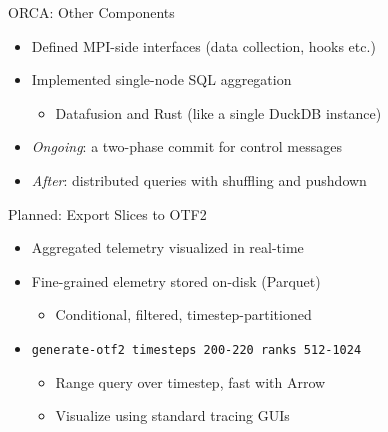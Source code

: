\documentclass[
  ignorenonframetext,
]{beamer}
\providecommand{\tightlist}{%
  \setlength{\itemsep}{0pt}\setlength{\parskip}{0pt}}\usepackage{longtable,booktabs,array}
\begin{document}
\begin{frame}[fragile]{ORCA: Other Components}
\label{orca-other-components}
\begin{itemize}
\tightlist
\item
  Defined MPI-side interfaces (data collection, hooks etc.)
\item
  Implemented single-node SQL aggregation

  \begin{itemize}
  \tightlist
  \item
    Datafusion and Rust (like a single DuckDB instance)
  \end{itemize}
\item
  \emph{Ongoing}: a two-phase commit for control messages
\item
  \emph{After}: distributed queries with shuffling and pushdown
\end{itemize}

\pause

\begin{block}{Planned: Export Slices to OTF2}
\label{planned-export-slices-to-otf2}
\begin{itemize}
\tightlist
\item
  Aggregated telemetry visualized in real-time
\item
  Fine-grained elemetry stored on-disk (Parquet)

  \begin{itemize}
  \tightlist
  \item
    Conditional, filtered, timestep-partitioned
  \end{itemize}
\end{itemize}

\pause

\begin{itemize}
\tightlist
\item
  \texttt{generate-otf2\ timesteps\ 200-220\ ranks\ 512-1024}

  \begin{itemize}
  \tightlist
  \item
    Range query over timestep, fast with Arrow
  \item
    Visualize using standard tracing GUIs
  \end{itemize}
\end{itemize}
\end{block}
\end{frame}
\end{document}
